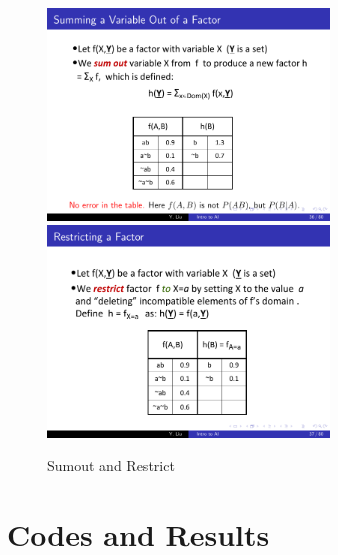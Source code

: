 \documentclass[a4paper, 11pt]{article}
\begin{document}
\begin{figure}[ht]
\centering
\includegraphics[width=7.5cm]{Pic/sumout}
\qquad
\includegraphics[width=7.5cm]{Pic/restrict}
\caption{Sumout and Restrict}
\label{Fig:sumout_restrict}
\end{figure}



\section{Codes and Results}
\end{document}
